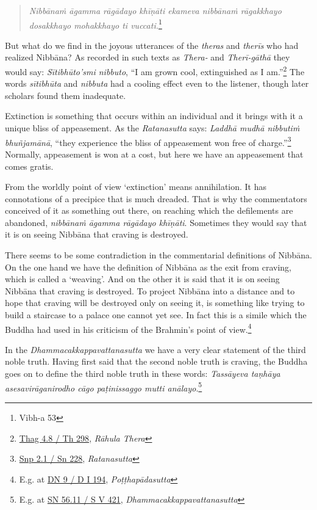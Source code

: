 \begin{quote}
\emph{Nibbānaṁ āgamma rāgādayo khīṇāti ekameva nibbānaṁ rāgakkhayo dosakkhayo mohakkhayo ti vuccati.}\footnote{Vibh-a 53}
\end{quote}

But what do we find in the joyous utterances of the \emph{theras} and \emph{therīs} who had realized Nibbāna? As recorded in such texts as \emph{Thera-} and \emph{Therī-gāthā} they would say: \emph{Sītibhūto'smi nibbuto}, ``I am grown cool, extinguished as I am.''\footnote{\href{https://suttacentral.net/thag4.8/pli/ms}{Thag 4.8 / Th 298}, \emph{Rāhula Thera}} The words \emph{sītibhūta} and \emph{nibbuta} had a cooling effect even to the listener, though later scholars found them inadequate.

Extinction is something that occurs within an individual and it brings with it a unique bliss of appeasement. As the \emph{Ratanasutta} says: \emph{Laddhā mudhā nibbutiṁ bhuñjamānā}, ``they experience the bliss of appeasement won free of charge.''\footnote{\href{https://suttacentral.net/snp2.1/pli/ms}{Snp 2.1 / Sn 228}, \emph{Ratanasutta}} Normally, appeasement is won at a cost, but here we have an appeasement that comes gratis.

From the worldly point of view `extinction' means annihilation. It has connotations of a precipice that is much dreaded. That is why the commentators conceived of it as something out there, on reaching which the defilements are abandoned, \emph{nibbānaṁ āgamma rāgādayo khīṇāti}. Sometimes they would say that it is on seeing Nibbāna that craving is destroyed.

There seems to be some contradiction in the commentarial definitions of Nibbāna. On the one hand we have the definition of Nibbāna as the exit from craving, which is called a `weaving'. And on the other it is said that it is on seeing Nibbāna that craving is destroyed. To project Nibbāna into a distance and to hope that craving will be destroyed only on seeing it, is something like trying to build a staircase to a palace one cannot yet see. In fact this is a simile which the Buddha had used in his criticism of the Brahmin's point of view.\footnote{E.g. at \href{https://suttacentral.net/dn9/pli/ms}{DN 9 / D I 194}, \emph{Poṭṭhapādasutta}}

In the \emph{Dhammacakkappavattanasutta} we have a very clear statement of the third noble truth. Having first said that the second noble truth is craving, the Buddha goes on to define the third noble truth in these words: \emph{Tassāyeva taṇhāya asesavirāganirodho cāgo paṭinissaggo mutti anālayo}.\footnote{E.g. at \href{https://suttacentral.net/sn56.11/pli/ms}{SN 56.11 / S V 421}, \emph{Dhammacakkappavattanasutta}}

